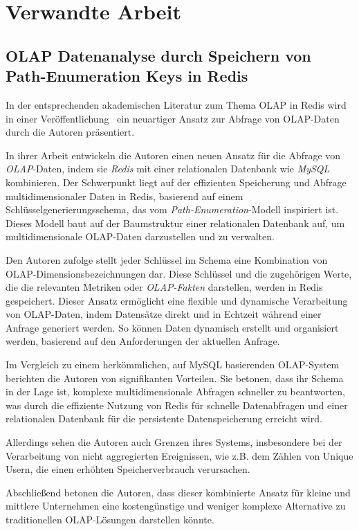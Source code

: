 \section{Verwandte Arbeit}
\subsection{OLAP Datenanalyse durch Speichern von Path-Enumeration Keys in Redis}
In der entsprechenden akademischen Literatur zum Thema OLAP in Redis wird in einer Veröffentlichung~\cite{loyola_building_2012} ein neuartiger Ansatz zur Abfrage von OLAP-Daten durch die Autoren präsentiert.

In ihrer Arbeit entwickeln die Autoren einen neuen Ansatz für die Abfrage von \emph{OLAP}-Daten, indem sie \emph{Redis} mit einer relationalen Datenbank wie \emph{MySQL} kombinieren. Der Schwerpunkt liegt auf der effizienten Speicherung und Abfrage multidimensionaler Daten in Redis, basierend auf einem Schlüsselgenerierungsschema, das vom \emph{Path-Enumeration}-Modell inspiriert ist. Dieses Modell baut auf der Baumstruktur einer relationalen Datenbank auf, um multidimensionale OLAP-Daten darzustellen und zu verwalten.

Den Autoren zufolge stellt jeder Schlüssel im Schema eine Kombination von OLAP-Dimensionsbezeichnungen dar. Diese Schlüssel und die zugehörigen Werte, die die relevanten Metriken oder \emph{OLAP-Fakten} darstellen, werden in Redis gespeichert. Dieser Ansatz ermöglicht eine flexible und dynamische Verarbeitung von OLAP-Daten, indem Datensätze direkt und in Echtzeit während einer Anfrage generiert werden. So können Daten dynamisch erstellt und organisiert werden, basierend auf den Anforderungen der aktuellen Anfrage.

Im Vergleich zu einem herkömmlichen, auf MySQL basierenden OLAP-System berichten die Autoren von signifikanten Vorteilen. Sie betonen, dass ihr Schema in der Lage ist, komplexe multidimensionale Abfragen schneller zu beantworten, was durch die effiziente Nutzung von Redis für schnelle Datenabfragen und einer relationalen Datenbank für die persistente Datenspeicherung erreicht wird.

Allerdings sehen die Autoren auch Grenzen ihres Systems, insbesondere bei der Verarbeitung von nicht aggregierten Ereignissen, wie z.B. dem Zählen von Unique Usern, die einen erhöhten Speicherverbrauch verursachen.

Abschließend betonen die Autoren, dass dieser kombinierte Ansatz für kleine und mittlere Unternehmen eine kostengünstige und weniger komplexe Alternative zu traditionellen OLAP-Lösungen darstellen könnte.

